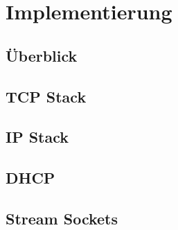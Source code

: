 \chapter{Implementierung}

\section{Überblick}


\section{TCP Stack}

\section{IP Stack}

\section{DHCP}

\section{Stream Sockets}


